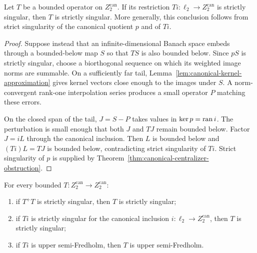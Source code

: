 \begin{lemma}
\label{lem:canonical-strictly-singular-lifting}
Let $T$ be a bounded operator on $Z_2^{\mathrm{can}}$.  If its restriction
$Ti:\ell_2\to Z_2^{\mathrm{can}}$ is strictly singular, then $T$ is strictly singular.
More generally, this conclusion follows from strict singularity of the canonical quotient $p$
and of $Ti$.
\leanok
\end{lemma}

\begin{proof}
Suppose instead that an infinite-dimensional Banach space embeds through a bounded-below map
$S$ so that $TS$ is also bounded below.  Since $pS$ is strictly singular, choose a biorthogonal
sequence on which its weighted image norms are summable.  On a sufficiently far tail,
Lemma~\ref{lem:canonical-kernel-approximation} gives kernel vectors close enough to the images
under $S$.  A norm-convergent rank-one interpolation series produces a small operator $P$
matching these errors.

On the closed span of the tail, $J=S-P$ takes values in $\ker p=\operatorname{ran} i$.  The perturbation is
small enough that both $J$ and $TJ$ remain bounded below.  Factor $J=iL$ through the canonical
inclusion.  Then $L$ is bounded below and $(Ti)L=TJ$ is bounded below, contradicting strict
singularity of $Ti$.  Strict singularity of $p$ is supplied by
Theorem~\ref{thm:canonical-centralizer-obstruction}.
\end{proof}

\begin{theorem}
\label{thm:cgp-operator-propositions}
For every bounded $T:Z_2^{\mathrm{can}}\to Z_2^{\mathrm{can}}$:
\begin{enumerate}
\item if $T^+T$ is strictly singular, then $T$ is strictly singular;
\item if $Ti$ is strictly singular for the canonical inclusion $i:\ell_2\to Z_2^{\mathrm{can}}$,
then $T$ is strictly singular;
\item if $Ti$ is upper semi-Fredholm, then $T$ is upper semi-Fredholm.
\end{enumerate}
\notready
\end{theorem}

